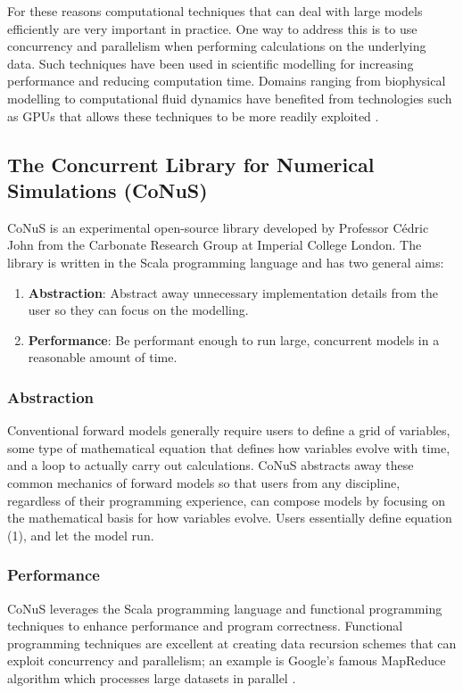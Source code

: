 \documentclass[12pt]{article}
\begin{document}
For these reasons computational techniques that can deal with large models efficiently are very important in practice. One way to address this is to use concurrency and parallelism when performing calculations on the underlying data. Such techniques have been used in scientific modelling for increasing performance and reducing computation time. Domains ranging from biophysical modelling to computational fluid dynamics have benefited from technologies such as GPUs that allows these techniques to be more readily exploited \autocite{4490127}.

\subsection{The Concurrent Library for Numerical Simulations (CoNuS)}
CoNuS is an experimental open-source library developed by Professor Cédric John from the Carbonate Research Group at Imperial College London. The library is written in the Scala programming language and has two general aims:

\begin{enumerate}
\item \textbf{Abstraction}: Abstract away unnecessary implementation details from the user so they can focus on the modelling. \\
\item \textbf{Performance}: Be performant enough to run large, concurrent models in a reasonable amount of time.
\end{enumerate}

\subsubsection{Abstraction}
Conventional forward models generally require users to define a grid of variables, some type of mathematical equation that defines how variables evolve with time, and a loop to actually carry out calculations. CoNuS abstracts away these common mechanics of forward models so that users from any discipline, regardless of their programming experience, can compose models by focusing on the mathematical basis for how variables evolve. Users essentially define equation (1), and let the model run.

\subsubsection{Performance}
CoNuS leverages the Scala programming language and functional programming techniques to enhance performance and program correctness. Functional programming techniques are excellent at creating data recursion schemes that can exploit concurrency and parallelism; an example is Google's famous MapReduce algorithm which processes large datasets in parallel \autocite{LAMMEL20081}. 
\end{document}
